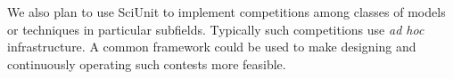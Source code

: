 \documentclass[9pt]{sig-alternate}
\begin{document}
We also plan to use SciUnit to implement competitions among classes of models or techniques in particular subfields. Typically such competitions use \emph{ad hoc} infrastructure. A common framework could be used to make designing and continuously operating such contests more feasible. 


\end{document}

